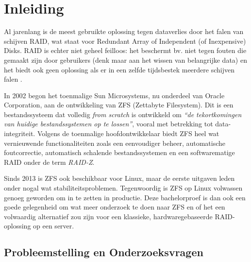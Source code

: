 
\chapter{Inleiding}
\label{ch:inleiding}

Al jarenlang is de meest gebruikte oplossing tegen dataverlies door het falen van schijven  RAID, wat staat voor Redundant Array of Independent (of Inexpensive) Disks. RAID is echter niet geheel feilloos: het beschermt bv. niet tegen fouten die gemaakt zijn door gebruikers (denk maar aan het wissen van belangrijke data) en het biedt ook geen oplossing als er in een zelfde tijdsbestek meerdere schijven falen \autocite{Chen1994}.

In 2002 begon het toenmalige Sun Microsystems, nu onderdeel van Oracle Corporation, aan de ontwikkeling van ZFS (Zettabyte Filesystem). Dit is een bestandssysteem dat volledig \textit{from scratch} is ontwikkeld om \textit{``de tekortkomingen van huidige bestandssystemen op te lossen''}\autocite{JeffBonwick_lastZFS}, vooral met betrekking tot data-integriteit. Volgens de toenmalige hoofdontwikkelaar \textcite{ZFSBonwick} biedt ZFS heel wat vernieuwende functionaliteiten zoals een eenvoudiger beheer, automatische foutcorrectie, automatisch schalende bestandssystemen en een softwarematige RAID onder de term \textit{RAID-Z}. 

Sinds 2013 is ZFS ook beschikbaar voor Linux, maar de eerste uitgaven leden onder nogal wat stabiliteitsproblemen. Tegenwoordig is ZFS op Linux volwassen genoeg geworden om in te zetten in productie. Deze bachelorproef is dan ook een goede gelegenheid om wat meer onderzoek te doen naar ZFS en of het een volwaardig alternatief zou zijn voor een klassieke, hardwaregebaseerde RAID-oplossing op een server.

\section{Probleemstelling en Onderzoeksvragen}
\label{sec:onderzoeksvragen}


